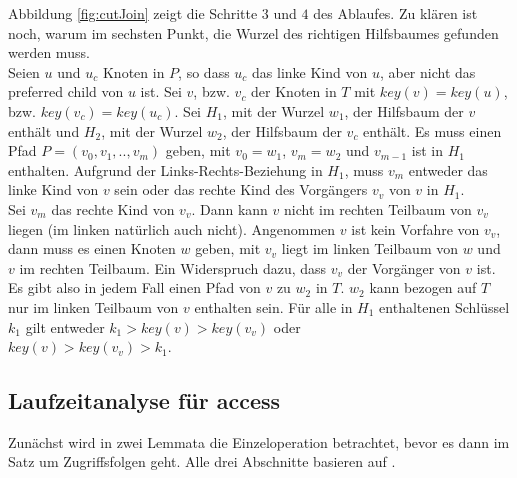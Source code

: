 \documentclass[a4paper,12pt]{article}
\begin{document}
Abbildung \ref{fig:cutJoin} zeigt die Schritte $3$ und $4$ des Ablaufes.
Zu klären ist noch, warum im sechsten Punkt, die Wurzel des richtigen Hilfsbaumes gefunden werden muss.\\ Seien $u$ und $u_c$ Knoten in $P$, so dass $u_c$ das linke Kind von $u$, aber nicht das preferred child von $u$ ist. Sei $v$, bzw. $v_c$ der Knoten in $T$ mit $\mathit{key}\left(v\right) = \mathit{key}\left(u\right)$, bzw. $\mathit{key}\left(v_c\right) = \mathit{key}\left(u_c\right)$. Sei $H_1$, mit der Wurzel $w_1$, der Hilfsbaum der $v$ enthält und $H_2$, mit der Wurzel $w_2$, der Hilfsbaum der $v_c$ enthält. Es muss einen Pfad $P = \left(v_0, v_1,.., v_m \right)$ geben, mit $v_0 = w_1$, $v_m = w_2$ und $v_{m-1}$ ist in $H_1$ enthalten. Aufgrund der Links-Rechts-Beziehung in $H_1$, muss $v_m$ entweder das linke Kind von $v$ sein oder das rechte Kind des Vorgängers $v_v$ von $v$ in $H_1$. \\
Sei $v_m$ das rechte Kind von $v_v$. Dann kann $v$ nicht im rechten Teilbaum von $v_v$ liegen (im linken natürlich auch nicht). Angenommen $v$ ist kein Vorfahre von $v_v$, dann muss es einen Knoten $w$ geben, mit $v_v$ liegt im linken Teilbaum von $w$ und $v$ im rechten Teilbaum. Ein Widerspruch dazu, dass $v_v$ der Vorgänger von $v$ ist.\\
Es gibt also in jedem Fall einen Pfad von $v$ zu $w_2$ in $T$. $w_2$ kann bezogen auf $T$ nur im linken Teilbaum von $v$ enthalten sein. Für alle in $H_1$ enthaltenen Schlüssel $k_1$ gilt entweder $k_1 > \mathit{key}\left(v\right) > \mathit{key}\left(v_v\right) $ oder \\ $ \mathit{key}\left(v\right) > \mathit{key}\left(v_v\right) > k_1 $. 


\subsection{Laufzeitanalyse für access}
Zunächst wird in zwei Lemmata die Einzeloperation betrachtet, bevor es dann im Satz um Zugriffsfolgen geht. Alle drei Abschnitte basieren auf \cite{demainDinamicOpti}.
\end{document}
